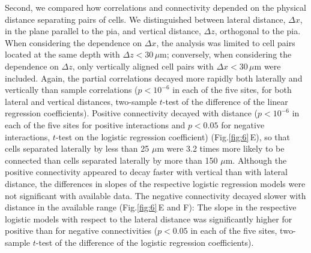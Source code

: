 \documentclass[10pt]{article}
\newcommand{\figref}[2]{Fig.\;\ref{fig:#1}\,#2}
\begin{document}
Second, we compared how correlations and connectivity depended on the physical distance separating pairs of cells. We distinguished between lateral distance, $\Delta x$, in the plane parallel to the pia, and vertical distance, $\Delta z$, orthogonal to the pia.  When considering the dependence on $\Delta x$, the analysis was limited to cell pairs located at the same depth with $\Delta z < 30\,\mu\mbox{m}$; conversely, when considering the dependence on $\Delta z$, only vertically aligned cell pairs with $\Delta x < 30\,\mu\mbox{m}$ were included. Again, the partial correlations decayed more rapidly both laterally and vertically than sample correlations ($p<10^{-6}$ in each of the five sites, for both lateral and vertical distances, two-sample $t$-test of the difference of the linear regression coefficients). 
Positive connectivity decayed with distance ($p<10^{-6}$ in each of the five sites for positive interactions and $p<0.05$ for negative interactions, $t$-test on the logistic regression coefficient) (\figref{6}{E}), so that cells separated laterally by less than 25 $\mu\mbox{m}$ were 3.2 times more likely to be connected than cells separated laterally by more than 150 $\mu\mbox{m}$. Although the positive connectivity appeared to decay faster with vertical than with lateral distance, the differences in slopes of the respective logistic regression models were not significant with available data. The negative connectivity decayed slower with distance in the available range (\figref{6}{E and F}): The slope in the respective logistic models with respect to the lateral distance was significantly higher for positive than for negative connectivities ($p<0.05$ in each of the five sites, two-sample $t$-test of the difference of the logistic regression coefficients). 
\end{document}

